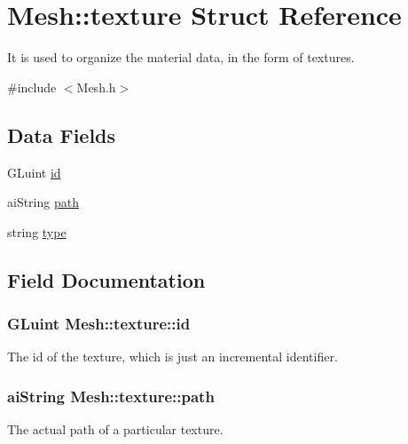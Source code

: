 \hypertarget{structMesh_1_1texture}{}\section{Mesh\+:\+:texture Struct Reference}
\label{structMesh_1_1texture}


It is used to organize the material data, in the form of textures.  




{\ttfamily \#include $<$Mesh.\+h$>$}

\subsection*{Data Fields}
\begin{DoxyCompactItemize}
\item 
G\+Luint \hyperlink{structMesh_1_1texture_a8947122a24792f43ea672f3cacba799a}{id}
\item 
ai\+String \hyperlink{structMesh_1_1texture_afbfb718aba12dfdb4996d9dc10ec4a2a}{path}
\item 
string \hyperlink{structMesh_1_1texture_a69224b22e2c2d7f180c333adbe163655}{type}
\end{DoxyCompactItemize}


\subsection{Field Documentation}
\subsubsection[{\texorpdfstring{id}{id}}]{\setlength{\rightskip}{0pt plus 5cm}G\+Luint Mesh\+::texture\+::id}\hypertarget{structMesh_1_1texture_a8947122a24792f43ea672f3cacba799a}{}\label{structMesh_1_1texture_a8947122a24792f43ea672f3cacba799a}
The id of the texture, which is just an incremental identifier. 
\subsubsection[{\texorpdfstring{path}{path}}]{\setlength{\rightskip}{0pt plus 5cm}ai\+String Mesh\+::texture\+::path}\hypertarget{structMesh_1_1texture_afbfb718aba12dfdb4996d9dc10ec4a2a}{}\label{structMesh_1_1texture_afbfb718aba12dfdb4996d9dc10ec4a2a}
The actual path of a particular texture. 
